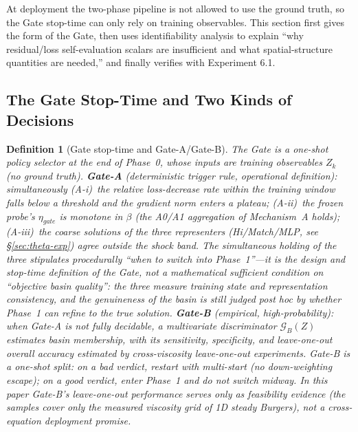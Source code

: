 \documentclass[11pt]{article}
\newtheorem{definition}{Definition}[section]
\numberwithin{equation}{section}
\begin{document}
At deployment the two-phase pipeline is not allowed to use the ground truth, so the Gate stop-time can only rely on training observables. This section first gives the form of the Gate, then uses identifiability analysis to explain ``why residual/loss self-evaluation scalars are insufficient and what spatial-structure quantities are needed,'' and finally verifies with Experiment 6.1.

\subsection{The Gate Stop-Time and Two Kinds of Decisions}\label{sec:gate}

\begin{definition}[Gate stop-time and Gate-A/Gate-B]\label{def:gateAB}
The Gate is a \emph{one-shot} policy selector at the end of Phase~0, whose inputs are training observables $Z_k$ (no ground truth). \textbf{Gate-A} (deterministic trigger rule, operational definition): simultaneously (A-i)~the relative loss-decrease rate within the training window falls below a threshold and the gradient norm enters a plateau; (A-ii)~the frozen probe's $\eta_{gate}$ is monotone in $\beta$ (the A0/A1 aggregation of Mechanism~A holds); (A-iii)~the coarse solutions of the three representers (Hi/Match/MLP, see \S\ref{sec:theta-exp}) agree outside the shock band. The simultaneous holding of the three stipulates procedurally ``when to switch into Phase~1''---it is the design and stop-time definition of the Gate, \emph{not} a mathematical sufficient condition on ``objective basin quality'': the three measure training state and representation consistency, and the genuineness of the basin is still judged post hoc by whether Phase~1 can refine to the true solution. \textbf{Gate-B} (empirical, high-probability): when Gate-A is not fully decidable, a multivariate discriminator $\mathcal G_B(Z)$ estimates basin membership, with its sensitivity, specificity, and leave-one-out overall accuracy estimated by cross-viscosity leave-one-out experiments. Gate-B is a \emph{one-shot split}: on a bad verdict, restart with multi-start (no down-weighting escape); on a good verdict, enter Phase~1 and do not switch midway. In this paper Gate-B's leave-one-out performance serves only as \emph{feasibility evidence} (the samples cover only the measured viscosity grid of 1D steady Burgers), not a cross-equation deployment promise.
\end{definition}
\end{document}

